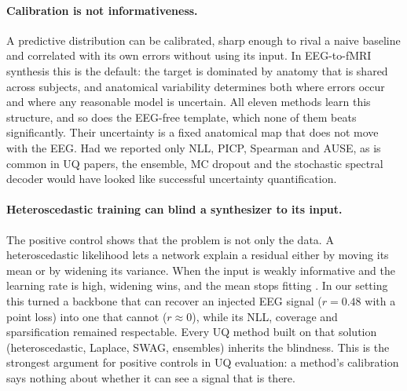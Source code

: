 \paragraph{Calibration is not informativeness.} A predictive distribution can be calibrated, sharp enough to rival a naive baseline and correlated with its own errors without using its input. In EEG-to-fMRI synthesis this is the default: the target is dominated by anatomy that is shared across subjects, and anatomical variability determines both where errors occur and where any reasonable model is uncertain. All eleven methods learn this structure, and so does the EEG-free template, which none of them beats significantly. Their uncertainty is a fixed anatomical map that does not move with the EEG. Had we reported only NLL, PICP, Spearman and AUSE, as is common in UQ papers, the ensemble, MC dropout and the stochastic spectral decoder would have looked like successful uncertainty quantification.

\paragraph{Heteroscedastic training can blind a synthesizer to its input.} The positive control shows that the problem is not only the data. A heteroscedastic likelihood lets a network explain a residual either by moving its mean or by widening its variance. When the input is weakly informative and the learning rate is high, widening wins, and the mean stops fitting \citep{seitzer2022pitfalls}. In our setting this turned a backbone that can recover an injected EEG signal ($r=0.48$ with a point loss) into one that cannot ($r\approx0$), while its NLL, coverage and sparsification remained respectable. Every UQ method built on that solution (heteroscedastic, Laplace, SWAG, ensembles) inherits the blindness. This is the strongest argument for positive controls in UQ evaluation: a method's calibration says nothing about whether it can see a signal that is there.

